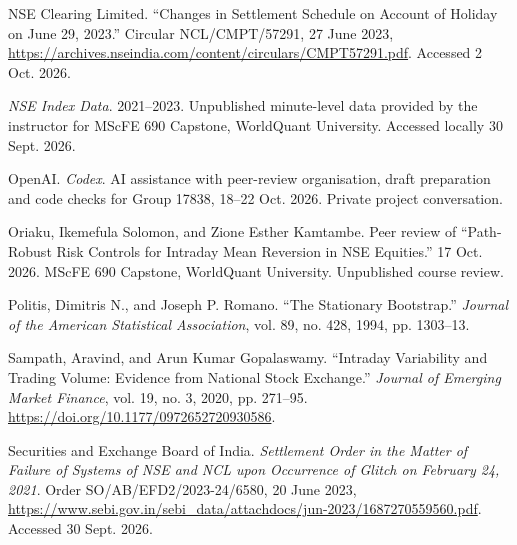 \documentclass[11pt,a4paper]{article}
\begin{document}
{\RaggedRight\hangindent=1.27cm\noindent NSE Clearing Limited. “Changes in Settlement Schedule on Account of Holiday on June 29, 2023.” Circular NCL/CMPT/57291, 27 June 2023, \url{https://archives.nseindia.com/content/circulars/CMPT57291.pdf}. Accessed 2 Oct. 2026.\par}\vspace{5pt}

{\RaggedRight\hangindent=1.27cm\noindent \textit{NSE Index Data}. 2021--2023. Unpublished minute-level data provided by the instructor for MScFE 690 Capstone, WorldQuant University. Accessed locally 30 Sept. 2026.\par}\vspace{5pt}

{\RaggedRight\hangindent=1.27cm\noindent OpenAI. \textit{Codex}. AI assistance with peer-review organisation, draft preparation and code checks for Group 17838, 18--22 Oct. 2026. Private project conversation.\par}\vspace{5pt}

{\RaggedRight\hangindent=1.27cm\noindent Oriaku, Ikemefula Solomon, and Zione Esther Kamtambe. Peer review of “Path-Robust Risk Controls for Intraday Mean Reversion in NSE Equities.” 17 Oct. 2026. MScFE 690 Capstone, WorldQuant University. Unpublished course review.\par}\vspace{5pt}

{\RaggedRight\hangindent=1.27cm\noindent Politis, Dimitris N., and Joseph P. Romano. “The Stationary Bootstrap.” \textit{Journal of the American Statistical Association}, vol. 89, no. 428, 1994, pp. 1303--13.\par}\vspace{5pt}

{\RaggedRight\hangindent=1.27cm\noindent Sampath, Aravind, and Arun Kumar Gopalaswamy. “Intraday Variability and Trading Volume: Evidence from National Stock Exchange.” \textit{Journal of Emerging Market Finance}, vol. 19, no. 3, 2020, pp. 271–95. \url{https://doi.org/10.1177/0972652720930586}.\par}\vspace{5pt}

{\RaggedRight\hangindent=1.27cm\noindent Securities and Exchange Board of India. \textit{Settlement Order in the Matter of Failure of Systems of NSE and NCL upon Occurrence of Glitch on February 24, 2021}. Order SO/AB/EFD2/2023-24/6580, 20 June 2023, \url{https://www.sebi.gov.in/sebi_data/attachdocs/jun-2023/1687270559560.pdf}. Accessed 30 Sept. 2026.\par}\vspace{5pt}
\end{document}
